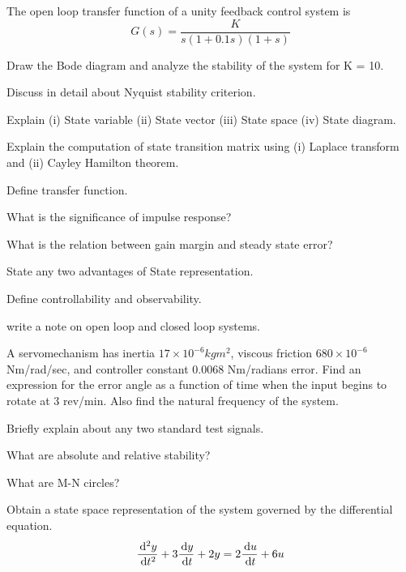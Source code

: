 \item \iitem The open loop transfer function of a unity feedback control system is 
  \[ G (s) = \frac{K}{s (1 + 0.1s) (1 + s)} \]
  
  Draw the Bode diagram and analyze the stability of the system for K = 10.
\Or
\item Discuss in detail about Nyquist stability criterion.
\ene

\item \iitem Explain (i) State variable (ii) State vector (iii) State space (iv) State diagram.
\Or
\item Explain the computation of state transition matrix using (i) Laplace transform and 
  (ii) Cayley Hamilton theorem.
\ene

\markC
\ene

\newpage

\sub{\subj}
\maxtime
\partA

\iitem Define transfer function.
\item What is the significance of impulse response?
\item What is the relation between gain margin and steady 
  state error?
\item State any two advantages of State representation.
\item Define controllability and observability.

\markA
\partB

\item write a note on open loop and closed loop systems.
\item A servomechanism has inertia $17 \times 10^{-6} kgm^2$, viscous friction
  $ 680 \times 10^{-6}$ Nm/rad/sec, and controller constant 0.0068 Nm/radians error.
  Find an expression for the error angle as a function of time when the input begins
  to rotate at 3 rev/min. Also find the natural frequency of the system.
\item Briefly explain about any two standard test signals.
\item What are absolute and relative stability?
\item What are M-N circles?
\item Obtain a state space representation of the system governed by the
  differential equation.
  \[ \dfrac{\,\mathrm{d}^2y}{\,\mathrm{d} t^2} + 3 \dfrac{\,\mathrm{d} y}{\,\mathrm{d} t} + 2y = 2\dfrac{\,\mathrm{d} u}{\,\mathrm{d} t} + 6u \]

\newpage \again

\markB
\partC

